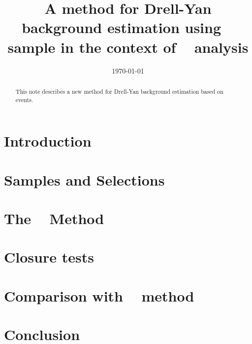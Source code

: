 \documentclass{cmspaper}
\begin{document}
\begin{titlepage}


  \date{\today}

  \title{A method for Drell-Yan background estimation using \gjets~ sample in the context of \hww~ analysis}
  
  

  \begin{abstract}
    This note describes a new method for Drell-Yan background estimation based on \gjets~ events.
  \end{abstract} 

\end{titlepage}
\tableofcontents
\listoftables
\listoffigures
\newpage 

\section{Introduction}
   \label{sec:introduction}
   
\section{Samples and Selections}
  \label{sec:datasets}
  
\section{The \zm~ Method}
   \label{sec:method}
   
\section{Closure tests}
   \label{sec:closure}
   
\section{Comparison with \routin~ method}
   \label{sec:comparison}
   
\section{Conclusion}
   
\clearpage

\end{document}
